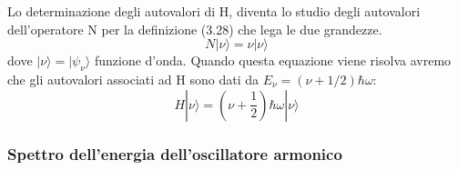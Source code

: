 Lo determinazione degli autovalori di H, diventa lo studio degli autovalori dell'operatore N per la definizione (3.28) che lega le due grandezze.
\begin{equation*}
	N|\nu \rangle = \nu |\nu \rangle
\end{equation*}
dove $|\nu \rangle = | \psi_{\nu} \rangle $ funzione d'onda. Quando questa equazione viene risolva avremo che gli autovalori associati ad H sono dati da $E_\nu = (\nu+1/2)\hbar \omega$:
\begin{equation*}
	H|\nu \rangle = (\nu +\frac{1}{2})\hbar\omega |\nu \rangle
\end{equation*}

\subsubsection{Spettro dell'energia dell'oscillatore armonico}

